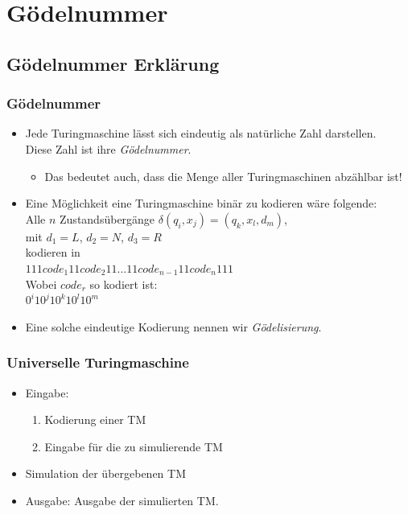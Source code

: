 



\section{Gödelnummer}
\subsection{Gödelnummer Erklärung}
\begin{frame}
	\frametitle{Gödelnummer}
	\begin{itemize}
		\item Jede Turingmaschine lässt sich eindeutig als natürliche Zahl darstellen. \\ Diese Zahl ist ihre \emph{Gödelnummer}.
		\begin{itemize}
			\item Das bedeutet auch, dass die Menge aller Turingmaschinen abzählbar ist!
		\end{itemize}
		\item Eine Möglichkeit eine Turingmaschine binär zu kodieren wäre folgende: \\
		Alle $n$ Zustandsübergänge $\delta(q_i, x_j) = (q_k, x_l, d_m)$, \\
		mit $d_1 = L$, $d_2 = N$, $d_3 = R$ \\
		kodieren in \\
		$111 code_1 11 code_2 11 ... 11 code_{n-1} 11 code_n 111$ \\
		Wobei $code_r$ so kodiert ist: \\
		$0^i 1 0^j 1 0^k 1 0^l 1 0^m$
		\item Eine solche eindeutige Kodierung nennen wir \emph{Gödelisierung}.
	\end{itemize}
\end{frame}

\begin{frame}
	\frametitle{Universelle Turingmaschine}
\begin{itemize}
	\item Eingabe:
	\begin{enumerate}
	\item Kodierung einer TM
	\item Eingabe für die zu simulierende TM
	\end{enumerate}
	\item Simulation der übergebenen TM
	\item Ausgabe: Ausgabe der simulierten TM.
	\end{itemize}
\end{frame}
